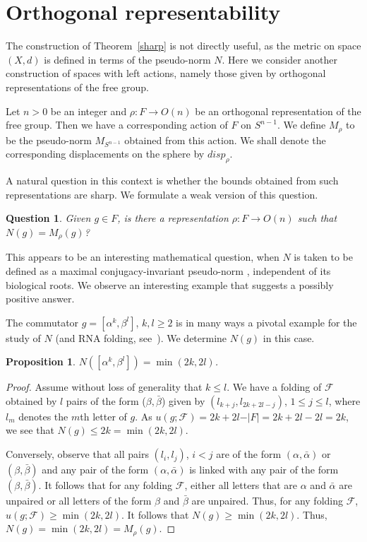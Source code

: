 \documentclass{amsart}
\theoremstyle{plain}
\newtheorem{proposition}[theorem]{Proposition}
\newtheorem{question}{Question}
\theoremstyle{definition}
\theoremstyle{remark}
\newcommand{\F}{\mathcal{F}}
\renewcommand{\a}{\alpha}
\renewcommand{\b}{\beta}
\newcommand{\ba}{\bar{\alpha}}
\newcommand{\bb}{\bar{\beta}}
\begin{document}
\section{Orthogonal representability}\label{S:ortho}

The construction of Theorem~\ref{sharp} is not directly useful, as the metric on space $(X,d)$ is defined in terms of the  pseudo-norm  $N$. Here we consider another construction of spaces with left actions, namely those given by orthogonal representations of the free group.

Let $n>0$ be an integer and $\rho:F\to O(n)$ be an orthogonal representation of the free group. Then we have a corresponding action of $F$ on $S^{n-1}$. We define $M_\rho$ to be the  pseudo-norm  $M_{S^{n-1}}$ obtained from this action. We shall denote the corresponding displacements on the sphere by $disp_\rho$.

A natural question in this context is whether the bounds obtained from such representations are sharp. We formulate a weak version of this question.

\begin{question}
Given $g\in F$, is there a representation $\rho:F\to O(n)$ such that $N(g)=M_\rho(g)$?
\end{question}

This appears to be an interesting mathematical question, when $N$ is taken to be defined as a maximal conjugacy-invariant  pseudo-norm , independent of its biological roots. We observe an interesting example that suggests a possibly positive answer.

The commutator $g=[\a^k,\b^l]$, $k,l\geq 2$ is in many ways a pivotal example for the study of $N$ (and RNA folding, see~\cite{Ga}). We determine $N(g)$ in this case.

\begin{proposition}\label{comm}
$N([\a^k,\b^l])=\min(2k,2l)$. 
\end{proposition}
\begin{proof}
Assume without loss of generality that $k\leq l$. We have a folding of $\F$ obtained by $l$ pairs of the form ($\b, \bb$) given by $(l_{k+j},l_{2k+2l-j})$, $1\leq j\leq l$, where $l_m$ denotes the $m$th letter of $g$.  
As $u(g;\F)=2k+2l-\vert F\vert=2k+2l-2l=2k$, we see that $N(g)\leq 2k=\min(2k,2l)$.

Conversely, observe that all pairs $(l_i,l_j)$, $i<j$ are of the form $(\a,\ba)$ or $(\b,\bb)$ and any pair of the form $(\a,\ba)$ is linked with any pair of the form $(\b,\bb)$. It follows that for any folding $\F$, either all letters that are $\a$ and $\ba$ are unpaired or all letters of the form $\b$ and $\bb$ are unpaired. Thus, for any folding $\F$, $u(g;\F)\geq \min(2k,2l)$. It follows that $N(g)\geq \min(2k,2l)$. Thus, $N(g)=\min(2k,2l)=M_\rho(g)$.
\end{proof}
\end{document}
